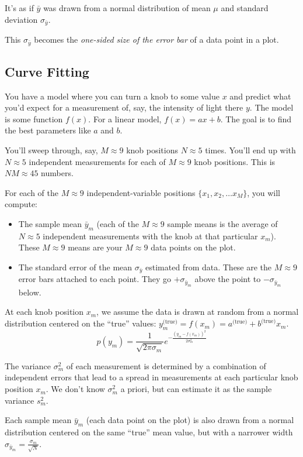 \documentclass[12pt]{article}
\begin{document}
It's as if $\bar y$ was drawn from a normal distribution of mean $\mu$ and standard deviation $\sigma_{\bar y}$.

This $\sigma_{\bar y}$ becomes the \textit{one-sided size of the error bar} of a data point in a plot.

\pagebreak

\subsection*{Curve Fitting}

You have a model where you can turn a knob to some value $x$ and predict what you'd expect for a measurement of, say, the intensity of light there $y$. The model is some function $f(x)$. For a linear model, $f(x) = a x + b$. The goal is to find the best parameters like $a$ and $b$.

You'll sweep through, say, $M\approx9$ knob positions $N\approx5$ times. You'll end up with $N\approx5$ independent measurements for each of $M\approx9$ knob positions. This is $NM\approx45$ numbers.

For each of the $M\approx9$ independent-variable positions $\{x_1, x_2, \dots x_M\}$, you will compute:
\begin{itemize}
	\item The sample mean $\bar y_m$ (each of the $M\approx9$ sample means is the average of $N\approx5$ independent measurements with the knob at that particular $x_m$). These $M\approx9$ means are your  $M\approx9$ data points on the plot.
	\item The standard error of the mean $\sigma_{\bar y}$ estimated from data. These are the  $M\approx9$ error bars attached to each point. They go $+\sigma_{\bar y_m}$ above the point to $-\sigma_{\bar y_m}$ below.
\end{itemize}

At each knob position $x_m$, we assume the data is drawn at random from a normal distribution centered on the ``true'' values: $y^\textrm{(true)}_m = f(x_m) = a^\textrm{(true)} + b^\textrm{(true)} x_m$.
\[
p(y_m) = \frac{1}{\sqrt{2 \pi \sigma_m}} e^{-\frac{(y_m-f(x_m))^2}{2\sigma_m^2}}
\]

The variance $\sigma_m^2$ of each measurement is determined by a combination of independent errors that lead to a spread in measurements at each particular knob position $x_m$. We don't know $\sigma_m^2$ a priori, but can estimate it as the sample variance $s_m^2$.

Each sample mean $\bar y_m$ (each data point on the plot) is also drawn from a normal distribution centered on the same ``true'' mean value, but with a narrower width $\sigma_{\bar y_m} = \frac{\sigma_m}{\sqrt{N}}$.
\end{document}
